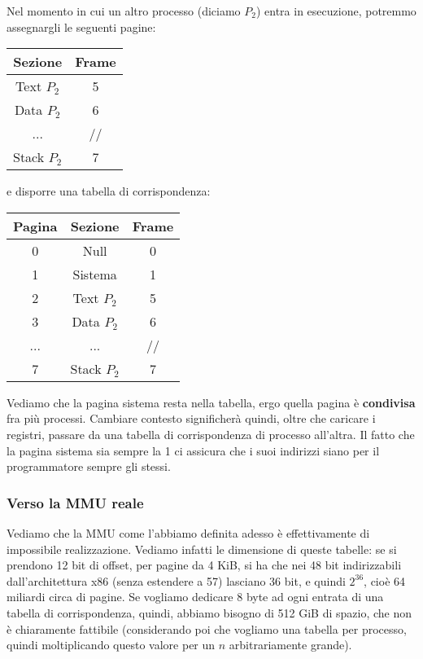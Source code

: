 \documentclass[a4paper,11pt]{article}
\begin{document}
Nel momento in cui un altro processo (diciamo $P_2$) entra in esecuzione, potremmo assegnargli le seguenti pagine:
\begin{table}[H]
	\center
	\begin{tabular} { | c | c | }
		\bfseries Sezione & \bfseries Frame \\
		\hline
		\textsf{Text} $P_2$ & 5 \\
		\textsf{Data} $P_2$ & 6 \\
		... & // \\
		\textsf{Stack} $P_2$ & 7 \\
	\end{tabular}
\end{table}
e disporre una tabella di corrispondenza:
\begin{table}[H]
	\center
	\begin{tabular} { | c | c | c | }
		\bfseries Pagina & \bfseries Sezione & \bfseries Frame \\
		\hline
		0 & \textsf{Null} & 0 \\
		1 & \textsf{Sistema} & 1 \\
		2 & \textsf{Text} $P_2$ & 5 \\
		3 & \textsf{Data} $P_2$ & 6 \\
		... &... & // \\
		7 & \textsf{Stack} $P_2$ & 7 \\
	\end{tabular}
\end{table}

Vediamo che la pagina sistema resta nella tabella, ergo quella pagina è \textbf{condivisa} fra più processi.
Cambiare contesto significherà quindi, oltre che caricare i registri, passare da una tabella di corrispondenza di processo all'altra.
Il fatto che la pagina sistema sia sempre la 1 ci assicura che i suoi indirizzi siano per il programmatore sempre gli stessi.

\subsubsection{Verso la MMU reale}
Vediamo che la MMU come l'abbiamo definita adesso è effettivamente di impossibile realizzazione.
Vediamo infatti le dimensione di queste tabelle: se si prendono 12 bit di offset, per pagine da 4 KiB, si ha che nei 48 bit indirizzabili dall'architettura x86 (senza estendere a 57) lasciano 36 bit, e quindi $2^{36}$, cioè 64 miliardi circa di pagine.
Se vogliamo dedicare 8 byte ad ogni entrata di una tabella di corrispondenza, quindi, abbiamo bisogno di 512 GiB di spazio, che non è chiaramente fattibile (considerando poi che vogliamo una tabella per processo, quindi moltiplicando questo valore per un $n$ arbitrariamente grande).
\end{document}
